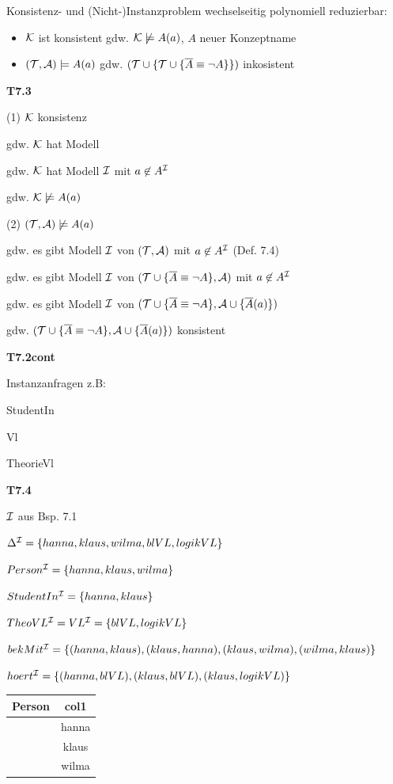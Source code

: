 Konsistenz- und (Nicht-)Instanzproblem wechselseitig polynomiell reduzierbar:

\begin{lemma} 

\begin{itemize}
	\item $\mathcal{K}$ ist konsistent gdw. $\mathcal{K} \not\models A(a)$, $A$ neuer Konzeptname
	\item $(\mathcal{T}, \mathcal{A}) \models A(a)$ gdw. $(\mathcal{T} \cup \{\mathcal{T} \cup \{\overline{A} \equiv \neg A\}\})$ inkosistent
\end{itemize}
\end{lemma}

\textbf{T7.3}

(1) $\mathcal{K}$ konsistenz

gdw. $\mathcal{K}$ hat Modell

gdw. $\mathcal{K}$ hat Modell $\mathcal{I}$ mit $a \not\in A^{\mathcal{I}}$

gdw. $\mathcal{K} \not\models A(a)$

(2) $(\mathcal{T}, \mathcal{A}) \not\models A(a)$

gdw. es gibt Modell $\mathcal{I}$ von $(\mathcal{T}, \mathcal{A})$ mit $a \not\in A^{\mathcal{I}}$ (Def. 7.4)

gdw. es gibt Modell $\mathcal{I}$ von $(\mathcal{T} \cup \{\overline{A} \equiv \neg A\}, \mathcal{A})$ mit $a \not\in A^{\mathcal{I}}$

gdw. es gibt Modell $\mathcal{I}$ von $(\mathcal{T} \cup \{\overline{A} \equiv \neg A\}, \mathcal{A} \cup \{\overline{A}(a)\})$

gdw. $(\mathcal{T} \cup \{\overline{A} \equiv \neg A\}, \mathcal{A} \cup \{\overline{A}(a)\})$ konsistent

\textbf{T7.2cont}

Instanzanfragen z.B:

StudentIn

Vl

TheorieVl

\textbf{T7.4}

$\mathcal{I}$ aus Bsp. 7.1

$\Delta^{\mathcal{I}} = \{hanna, klaus, wilma, blVL, logikVL\}$

$Person^{\mathcal{I}} = \{hanna,klaus,wilma\}$

$StudentIn^{\mathcal{I}} = \{hanna,klaus\}$

$TheoVL^{\mathcal{I}} = VL^{\mathcal{I}} = \{blVL, logikVL\}$

$bekMit^{\mathcal{I}} = \{(hanna,klaus), (klaus, hanna), (klaus, wilma), (wilma, klaus)\}$

$hoert^{\mathcal{I}} = \{(hanna, blVL), (klaus,blVL), (klaus,logikVL)\}$

\begin{tabular}{c | c}
Person & col1 \\ \hline
 & hanna \\
 & klaus \\
 & wilma
\end{tabular}

